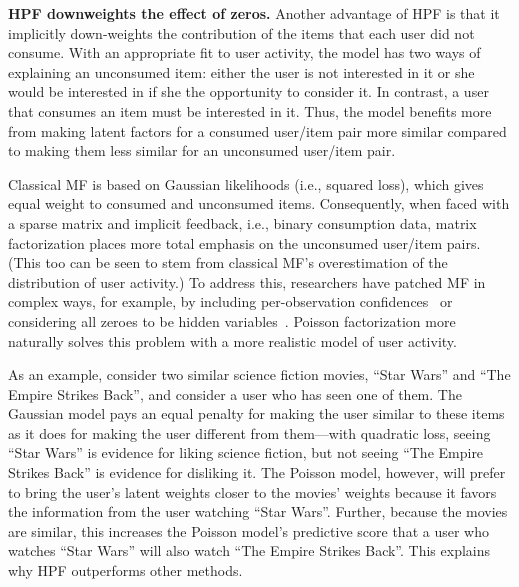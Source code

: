 
{\bf HPF downweights the effect of zeros.}  Another advantage of HPF
is that it implicitly down-weights the contribution of the items that
each user did not consume.  With an appropriate fit to user activity,
the model has two ways of explaining an unconsumed item: either the
user is not interested in it or she would be interested in if she the
opportunity to consider it. In contrast, a user that consumes an item
must be interested in it.  Thus, the model benefits more from making
latent factors for a consumed user/item pair more similar compared to
making them less similar for an unconsumed user/item pair.

Classical MF is based on Gaussian likelihoods (i.e., squared loss),
which gives equal weight to consumed and unconsumed items.
Consequently, when faced with a sparse matrix and implicit feedback,
i.e., binary consumption data, matrix factorization places more total
emphasis on the unconsumed user/item pairs.  (This too can be seen to
stem from classical MF's overestimation of the distribution of user
activity.)  To address this, researchers have patched MF in complex
ways, for example, by including per-observation
confidences~\cite{Koren:2009} or considering all zeroes to be hidden
variables~\cite{Paquet:2013p9197}.  Poisson factorization more
naturally solves this problem with a more realistic model of user
activity.

As an example, consider two similar science fiction movies, ``Star
Wars'' and ``The Empire Strikes Back'', and consider a user who has
seen one of them.  The Gaussian model pays an equal penalty for making
the user similar to these items as it does for making the user
different from them---with quadratic loss, seeing ``Star Wars'' is
evidence for liking science fiction, but not seeing ``The Empire
Strikes Back'' is evidence for disliking it.  The Poisson model,
however, will prefer to bring the user's latent weights closer to the
movies' weights because it favors the information from the user
watching ``Star Wars''. Further, because the movies are similar, this
increases the Poisson model's predictive score that a user who watches
``Star Wars'' will also watch ``The Empire Strikes Back''. This
explains why HPF outperforms other methods.

